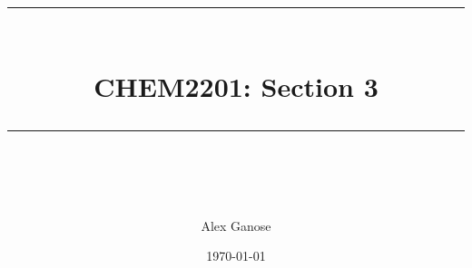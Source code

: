\newcommand{\horrule}[1]{\rule{\linewidth}{#1}} %
\title{
  \normalfont \normalsize
  \horrule{0.5pt} \\[0.4cm]
  \huge CHEM2201: Section 3 \\
  \horrule{2pt} \\[0.5cm]
}

\author{Alex Ganose}
\date{\normalsize\today}